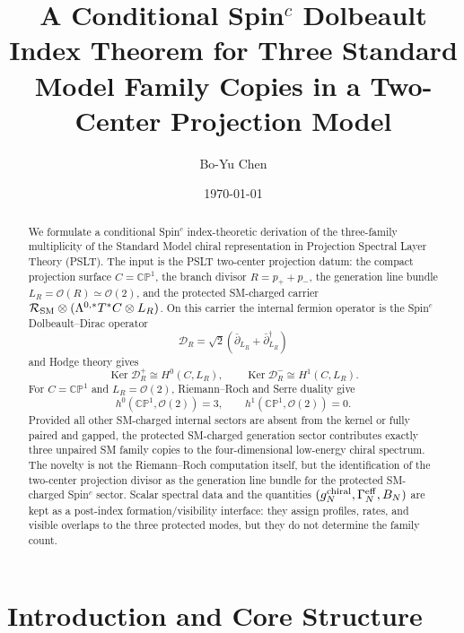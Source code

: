 \documentclass[aps,prd,preprint,notitlepage,nofootinbib,superscriptaddress,floatfix]{revtex4-2}
\newcommand{\Ker}{\operatorname{Ker}}
\newcommand{\cO}{\mathcal O}
\newcommand{\cR}{\mathcal R}
\newcommand{\CP}{\mathbb{CP}}
\newcommand{\scrD}{\mathscr D}
\theoremstyle{remark}
\begin{document}
\title{\texorpdfstring{A Conditional Spin\(^c\) Dolbeault Index Theorem for Three Standard Model Family Copies in a Two-Center Projection Model}{A Conditional Spinc Dolbeault Index Theorem for Three Standard Model Family Copies in a Two-Center Projection Model}}

\author{Bo-Yu Chen}

\date{\today}

\begin{abstract}
We formulate a conditional Spin\(^c\) index-theoretic derivation of the three-family multiplicity of the Standard Model chiral representation in Projection Spectral Layer Theory (PSLT).
The input is the PSLT two-center projection datum: the compact projection surface \(C=\CP^1\), the branch divisor \(R=p_+ + p_-\), the generation line bundle \(L_R=\cO(R)\simeq\cO(2)\), and the protected SM-charged carrier \(\cR_{\rm SM}\otimes(\Lambda^{0,*}T^*C\otimes L_R)\).
On this carrier the internal fermion operator is the Spin\(^c\) Dolbeault--Dirac operator
\[
\scrD_R=\sqrt2\left(\bar\partial_{L_R}+\bar\partial_{L_R}^\dagger\right)
\]
and Hodge theory gives
\[
\Ker \scrD_R^+\cong H^0(C,L_R),
\qquad
\Ker \scrD_R^-\cong H^1(C,L_R).
\]
For \(C=\CP^1\) and \(L_R=\cO(2)\), Riemann--Roch and Serre duality give
\[
h^0(\CP^1,\cO(2))=3,
\qquad
h^1(\CP^1,\cO(2))=0.
\]
Provided all other SM-charged internal sectors are absent from the kernel or fully paired and gapped, the protected SM-charged generation sector contributes exactly three unpaired SM family copies to the four-dimensional low-energy chiral spectrum.
The novelty is not the Riemann--Roch computation itself, but the identification of the two-center projection divisor as the generation line bundle for the protected SM-charged Spin\(^c\) sector.
Scalar spectral data and the quantities \((g_N^{\rm chiral},\Gamma_N^{\rm eff},B_N)\) are kept as a post-index formation/visibility interface: they assign profiles, rates, and visible overlaps to the three protected modes, but they do not determine the family count.
\end{abstract}

\maketitle

\section{Introduction and Core Structure}
\label{sec:core_structure}
\end{document}
